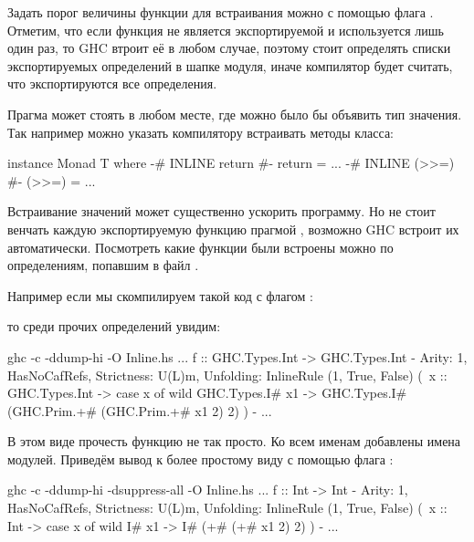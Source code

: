 Задать порог величины функции для встраивания можно 
с помощью флага .
Отметим, что если функция не является экспортируемой
и используется лишь один раз, то GHC втроит её в 
любом случае, поэтому стоит определять списки
экспортируемых определений в шапке модуля, иначе
компилятор будет считать, что экспортируются все
определения. 

Прагма  может стоять в любом месте,
где можно было бы объявить тип значения. 
Так например можно указать компилятору встраивать
методы класса:

\begin{code}
instance Monad T where
    {-# INLINE return #-}
    return = ...
    {-# INLINE (>>=) #-}
    (>>=)  = ...
\end{code}
  
Встраивание значений может существенно ускорить 
программу. Но не стоит венчать каждую экспортируемую функцию 
прагмой , возможно GHC встроит их автоматически. 
Посмотреть какие функции были встроены можно по определениям,
попавшим в файл . 

Например если мы скомпилируем такой код с флагом :

  
\noindent то среди прочих определений увидим:

\begin{code}
ghc -c -ddump-hi -O Inline.hs
...
  f :: GHC.Types.Int -> GHC.Types.Int
    {- Arity: 1, HasNoCafRefs, Strictness: U(L)m,
       Unfolding: InlineRule (1, True, False)
                  (\ x :: GHC.Types.Int ->
                   case x of wild { GHC.Types.I# x1 ->
                   GHC.Types.I# (GHC.Prim.+# (GHC.Prim.+# x1 2) 2) }) -}
...
\end{code}
  
В этом виде прочесть функцию не так просто. Ко всем именам 
добавлены имена модулей. Приведём вывод к более простому виду
с помощью флага :

\begin{code}
ghc -c -ddump-hi -dsuppress-all -O Inline.hs
...
f :: Int -> Int
    {- Arity: 1, HasNoCafRefs, Strictness: U(L)m,
       Unfolding: InlineRule (1, True, False)
       (\ x :: Int -> case x of wild { I# x1 -> I# (+# (+# x1 2) 2) }) -}
...
\end{code}
 
